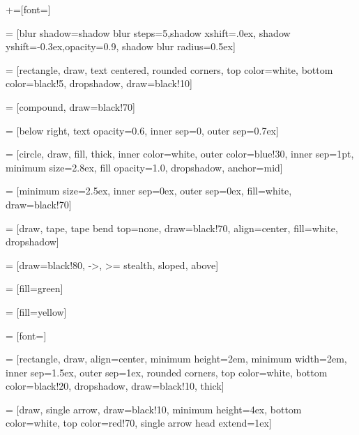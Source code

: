 
+=[font=\footnotesize \sffamily]

 = [blur shadow={shadow blur steps=5,shadow xshift=.0ex,
                                       shadow yshift=-0.3ex,opacity=0.9,
                                       shadow blur radius=0.5ex}]

 = [rectangle, draw, text centered,
                         rounded corners,
                         top color=white,
                         bottom color=black!5,
                         dropshadow,
                         draw=black!10]

 = [compound, draw=black!70]

 = [below right,
                             text opacity=0.6, inner sep=0, outer sep=0.7ex]

 = [circle, draw, fill, thick,
                          inner color=white,
                          outer color=blue!30,
                          inner sep=1pt,
                          minimum size=2.8ex,
                          fill opacity=1.0, dropshadow,
                          anchor=mid]

 = [minimum size=2.5ex, inner sep=0ex, outer sep=0ex,
                       fill=white, draw=black!70]

 = [draw, tape, tape bend top=none,
                         draw=black!70, align=center, fill=white, dropshadow]

 = [draw=black!80, ->, >= stealth, sloped, above]

 = [fill=green]

 = [fill=yellow]

 = [font=\normalsize]

 = [rectangle, draw, align=center,
                            minimum height=2em, minimum width=2em,
                            inner sep=1.5ex, outer sep=1ex,
                            rounded corners,
                            top color=white,
                            bottom color=black!20,
                            dropshadow,
                            draw=black!10, thick]

 = [draw, single arrow, draw=black!10, minimum height=4ex,
                         bottom color=white, top color=red!70,
                         single arrow head extend=1ex]

